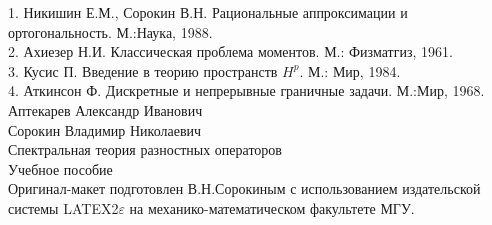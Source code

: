 \documentclass[12pt,a4paper]{article}
\theoremstyle{plain}   \newtheorem{Pro}{Задача}
\begin{document}
1. Никишин Е.М., Сорокин В.Н. Рациональные аппроксимации
и ортогональность. М.:Наука, 1988. \\

2. Ахиезер Н.И. Классическая проблема моментов. М.:
Физматгиз, 1961. \\

3. Кусис П. Введение в теорию пространств
$ H^p . $
М.: Мир, 1984. \\

4. Аткинсон Ф. Дискретные и непрерывные граничные задачи.
М.:Мир, 1968.
\newpage
$$ \; $$
Аптекарев Александр Иванович \\
Сорокин Владимир Николаевич
$$ \; $$
{\Large Спектральная теория разностных операторов}
$$ \; $$
Учебное пособие
$$ \; $$
$$ \; $$
Оригинал-макет подготовлен В.Н.Сорокиным с использованием
издательской системы LATEX2$ \varepsilon $
на механико-математическом факультете МГУ.
\end{document}
